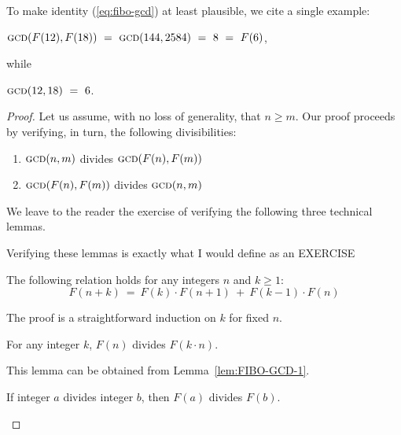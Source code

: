 \noindent
To make identity (\ref{eq:fibo-gcd}) at least plausible, we cite a single example:

\hspace*{.35in}
$\mbox{\sc gcd}(F(12), F(18)) 
   \ = \ \mbox{\sc gcd}(144,2584)
   \ = \ 8 \ = \ F(6)$,

\noindent while

\hspace*{.35in}
$\mbox{\sc gcd}(12,18) \ = \ 6$.

\medskip

\begin{proof}
Let us assume, with no loss of generality,  that $n \geq m$.  Our proof proceeds by verifying, in turn, the following divisibilities:
\begin{enumerate}
\item
$\mbox{\sc gcd}(n,m)$ divides $\mbox{\sc gcd}(F(n), F(m))$

\item
$\mbox{\sc gcd}(F(n), F(m))$ divides $\mbox{\sc gcd}(n,m)$
\end{enumerate}

\smallskip

\noindent
We leave to the reader the exercise of verifying the following three technical lemmas.

{\Arny Verifying these lemmas is exactly what I would define as an EXERCISE}

\begin{lemma}
\label{lem:FIBO-GCD-1}
The following relation holds for any integers $n$ and $k \geq 1$:
\[  F(n+k) \ = \ F(k) \cdot F(n+1) \ + \ F(k-1) \cdot F(n) \] 
\end{lemma}

\noindent
The proof is a straightforward induction on $k$ for fixed $n$.


\begin{lemma}
\label{lem:FIBO-GCD-2}
For any integer $k$, $F(n)$ divides $F(k \cdot n)$.
\end{lemma}

\noindent
This lemma can be obtained from Lemma~\ref{lem:FIBO-GCD-1}.

\begin{lemma}
\label{lem:FIBO-GCD-3}
If integer $a$ divides integer $b$, then $F(a)$ divides $F(b)$.
\end{lemma}


\end{proof}
